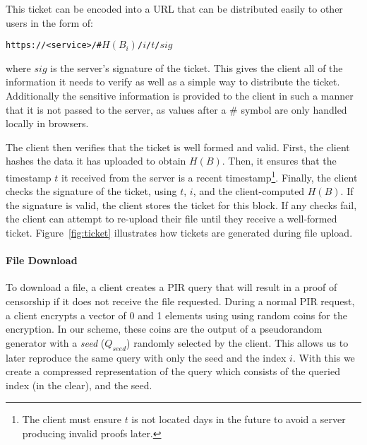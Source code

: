 This ticket can be encoded into a URL that can be distributed easily to other
users in the form of:
\begin{center}
    \texttt{https://<service>/\#$H(B_i)$/$i$/$t$/$sig$}
\end{center}
where $sig$ is the server's signature of the ticket. This gives the client all
of the information it needs to verify as well as a simple way to distribute the
ticket. Additionally the sensitive information is provided to the client in such
a manner that it is not passed to the server, as values after a \# symbol are
only handled locally in browsers.

The client then verifies that the ticket is well formed and valid. First, the
client hashes the data it has uploaded to obtain $H(B)$. Then, it ensures that
the timestamp $t$ it received from the server is a recent
timestamp\footnote{The client must ensure $t$ is not located days
in the future to avoid a server producing invalid proofs later.}.
Finally, the client checks the signature of the ticket, using
$t$, $i$, and the client-computed $H(B)$. If the signature is valid, the client
stores the ticket for this block. If any checks fail, the client can attempt to
re-upload their file until they receive a well-formed ticket.
Figure~\ref{fig:ticket} illustrates how tickets are generated during file
upload.




\FigProof

\paragraph{File Download}
To download a file, a client creates a PIR query that will
result in a proof of censorship if it does not receive the file requested.
During a normal PIR request, a client encrypts a vector of 0 and 1 elements
using using random coins for the encryption. In our scheme, these coins are the
output of a pseudorandom generator  with a \emph{seed} ($Q_{seed}$) randomly
selected by the client. This allows us to later reproduce the same query with
only the seed and the index $i$. With this we create a compressed representation
of the query which consists of the queried index (in the clear), and the seed.

